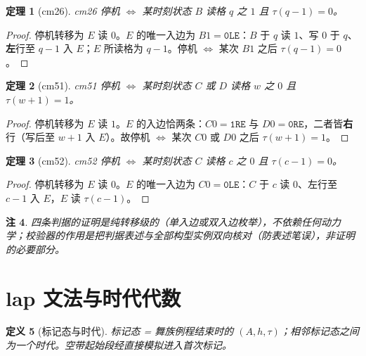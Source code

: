 \documentclass[11pt]{ctexart}
\newtheorem{theorem}{定理}[section]
\newtheorem{definition}[theorem]{定义}
\newtheorem{remark}[theorem]{注}
\begin{document}
\begin{theorem}[cm26]\label{thm:h26}
cm26 停机 $\iff$ 某时刻状态 $B$ 读格 $q$ 之 $1$ 且 $\tau(q{-}1)=0$。
\end{theorem}
\begin{proof}
停机转移为 $E$ 读 $0$。$E$ 的唯一入边为 $B1=\texttt{0LE}$：$B$ 于 $q$ 读 $1$、写 $0$ 于 $q$、\textbf{左}行至 $q{-}1$ 入 $E$；$E$ 所读格为 $q{-}1$。停机 $\iff$ 某次 $B1$ 之后 $\tau(q{-}1)=0$。
\end{proof}

\begin{theorem}[cm51]\label{thm:h51}
cm51 停机 $\iff$ 某时刻状态 $C$ 或 $D$ 读格 $w$ 之 $0$ 且 $\tau(w{+}1)=1$。
\end{theorem}
\begin{proof}
停机转移为 $E$ 读 $1$。$E$ 的入边恰两条：$C0=\texttt{1RE}$ 与 $D0=\texttt{0RE}$，二者皆\textbf{右}行（写后至 $w{+}1$ 入 $E$）。故停机 $\iff$ 某次 $C0$ 或 $D0$ 之后 $\tau(w{+}1)=1$。
\end{proof}

\begin{theorem}[cm52]\label{thm:h52}
cm52 停机 $\iff$ 某时刻状态 $C$ 读格 $c$ 之 $0$ 且 $\tau(c{-}1)=0$。
\end{theorem}
\begin{proof}
停机转移为 $E$ 读 $0$。$E$ 的唯一入边为 $C0=\texttt{0LE}$：$C$ 于 $c$ 读 $0$、左行至 $c{-}1$ 入 $E$，$E$ 读 $\tau(c{-}1)$。
\end{proof}

\begin{remark}
四条判据的证明是纯转移级的（单入边或双入边枚举），不依赖任何动力学；校验器的作用是把判据表述与全部构型实例双向核对（防表述笔误），非证明的必要部分。
\end{remark}

\section{lap 文法与时代代数}

\begin{definition}[标记态与时代]
标记态 = 舞族例程结束时的 $(A,h,\tau)$；相邻标记态之间为一个时代。空带起始段经直接模拟进入首次标记。
\end{definition}
\end{document}
